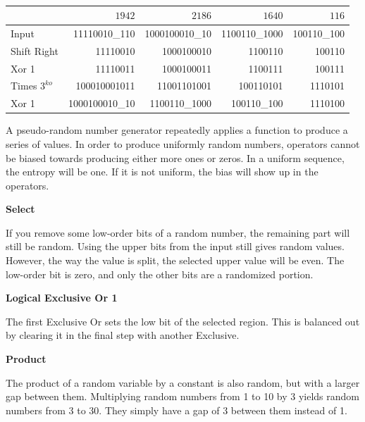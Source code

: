 \documentclass[letterpaper]{article}
\begin{document}
\begin{multicols}{2}
    \begin{table}[th]
        \centering
        \begin{tabular}{|l|r|r|r|r|}
            \hline
                           & \textbf{$1942$} & \textbf{$2186$} & \textbf{$1640$} & \textbf{$116$} \\
            \hline
            Input          & 11110010\_110   & 1000100010\_10  & 1100110\_1000   & 100110\_100    \\
            \hline
            Shift Right    & 11110010        & 1000100010      & 1100110         & 100110         \\
            \hline
            Xor 1          & 11110011        & 1000100011      & 1100111         & 100111         \\
            \hline
            Times $3^{ko}$ & 100010001011    & 11001101001     & 100110101       & 1110101        \\
            \hline
            Xor 1          & 1000100010\_10  & 1100110\_1000   & 100110\_100     & 1110100        \\
            \hline
        \end{tabular}
        \caption{}
    \end{table}

    A pseudo-random number generator repeatedly applies a function to produce a series of values. In order to produce uniformly random numbers, operators cannot be biased towards producing either more ones or zeros. In a uniform sequence, the entropy will be one. If it is not uniform, the bias will show up in the operators.

    \textbf{Select}

    If you remove some low-order bits of a random number, the remaining part will still be random. Using the upper bits from the input still gives random values. However, the way the value is split, the selected upper value will be even. The low-order bit is zero, and only the other bits are a randomized portion.

    \textbf{Logical Exclusive Or 1}

    The first Exclusive Or sets the low bit of the selected region. This is balanced out by clearing it in the final step with another Exclusive.

    \textbf{Product}

    The product of a random variable by a constant is also random, but with a larger gap between them. Multiplying random numbers from 1 to 10 by 3 yields random numbers from 3 to 30. They simply have a gap of 3 between them instead of 1.


\end{multicols}
\end{document}
